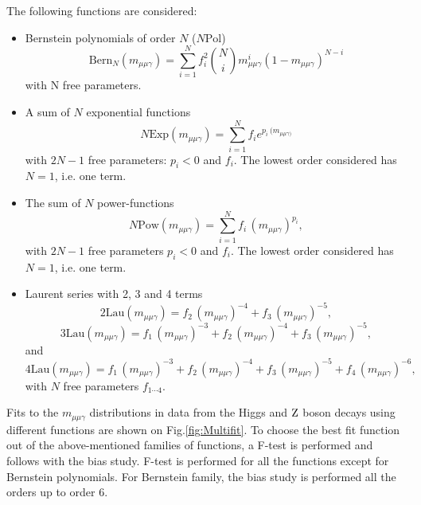 		The following functions are considered:
		
		\begin{itemize}
		\item Bernstein polynomials of order $N$ ($N\mathrm{Pol}$)
		\begin{equation}
		\mathrm{Bern}_N(m_{\mu\mu\gamma}) = \sum\limits_{i=1}^{N}f_{i}^{2} \binom Ni m_{\mu\mu\gamma}^{i}(1-m_{\mu\mu\gamma})^{N-i}
		\end{equation}
		with N free parameters.
		\item A sum of $N$ exponential functions
		\begin{equation}
		N\mathrm{Exp}(m_{\mu\mu\gamma})=\sum\limits_{i=1}^{N}f_ie^{p_i\ (m_{\mu\mu\gamma)}}
		\end{equation}
		with $2N-1$ free parameters: $p_i < 0$ and $f_i$.
		The lowest order considered has $N=1$, i.e. one term.
		
		\item The sum of $N$ power-functions
		\begin{equation}
		N\mathrm{Pow}(m_{\mu\mu\gamma})=\sum\limits_{i=1}^{N}f_i\,(m_{\mu\mu\gamma})^{p_i},
		\end{equation}
		with $2N-1$ free parameters $p_i < 0$ and $f_i$.
		The lowest order considered has $N=1$, i.e. one term.
		
		\item Laurent series with 2, 3 and 4 terms
		\begin{equation}
		2\mathrm{Lau}(m_{\mu\mu\gamma})=f_2\,(m_{\mu\mu\gamma})^{-4}+f_3\,(m_{\mu\mu\gamma})^{-5},
		\end{equation}
		\begin{equation}
		3\mathrm{Lau}(m_{\mu\mu\gamma})=f_1\,(m_{\mu\mu\gamma})^{-3}+f_2\,(m_{\mu\mu\gamma})^{-4}+f_3\,(m_{\mu\mu\gamma})^{-5},
		\end{equation}
		and
		\begin{equation}
		4\mathrm{Lau}(m_{\mu\mu\gamma})=f_1\,(m_{\mu\mu\gamma})^{-3}+f_2\,(m_{\mu\mu\gamma})^{-4}+f_3\,(m_{\mu\mu\gamma})^{-5}+f_4\,(m_{\mu\mu\gamma})^{-6},
		\end{equation}
		with $N$ free parameters $f_{1\cdots4}$.
		
		\end{itemize}
		
		Fits to the $m_{\mu\mu\gamma}$ distributions in data from the Higgs and $\mathrm{Z}$ boson decays using different functions are shown on Fig.\ref{fig:Multifit}. To choose the best fit function out of the above-mentioned families of functions, a F-test is performed and follows with the bias study. F-test is performed for all the functions except for Bernstein polynomials. For Bernstein family, the bias study is performed all the orders up to order 6. 
		
